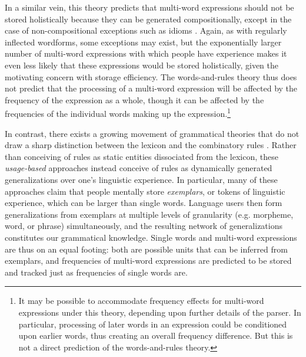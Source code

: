 \documentclass[authoryear]{elsarticle}
\begin{document}
In a similar vein, this theory predicts that multi-word expressions should not be stored holistically because they can be generated compositionally, except in the case of non-compositional exceptions such as idioms \citep{Swinney:1979wv}. Again, as with regularly inflected wordforms, some exceptions may exist, but the exponentially larger number of multi-word expressions with which people have experience makes it even less likely that these expressions would be stored holistically, given the motivating concern with storage efficiency. The words-and-rules theory thus does not predict that the processing of a multi-word expression will be affected by the frequency of the expression as a whole, though it can be affected by the frequencies of the individual words making up the expression.\footnote{It may be possible to accommodate frequency effects for multi-word expressions under this theory, depending upon further details of the parser. In particular, processing of later words in an expression could be conditioned upon earlier words, thus creating an overall frequency difference. But this is not a direct prediction of the words-and-rules theory.}


In contrast, there exists a growing movement of grammatical theories that do not draw a sharp distinction between the lexicon and the combinatory rules \citep[e.g.][]{Langacker:1987wg,Johnson:1997tf,Johnson:2006ii,Pierrehumbert:2000wh,Bybee:2003wl, Bybee:2006ul, Goldberg:2003bv,Gahl:is,Hay:2006dm,Baayen:2011eh,vandenBosch:2013ch}. Rather than conceiving of rules as static entities dissociated from the lexicon, these \emph{usage-based} approaches instead conceive of rules as dynamically generated generalizations over one's linguistic experience. In particular, many of these approaches \citep[notably][among others]{Bybee:2003wl,Hay:2006dm} claim that people mentally store \emph{exemplars}, or tokens of linguistic experience, which can be larger than single words. Language users then form generalizations from exemplars at multiple levels of granularity (e.g. morpheme, word, or phrase) simultaneously, and the resulting network of generalizations constitutes our grammatical knowledge. Single words and multi-word expressions are thus on an equal footing: both are possible units that can be inferred from exemplars, and frequencies of multi-word expressions are predicted to be stored and tracked just as frequencies of single words are.
\end{document}
